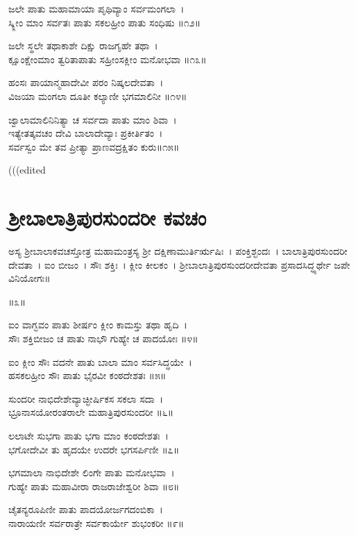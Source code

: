 ಜಲೇ ಪಾತು ಮಹಾಮಾಯಾ ಪೃಥಿವ್ಯಾಂ ಸರ್ವಮಂಗಲಾ~।\\
ಸ್ಕ್ಲೀಂ ಮಾಂ ಸರ್ವತಃ ಪಾತು ಸಕಲಹ್ರೀಂ ಪಾತು ಸಂಧಿಷು ॥೧೨॥

ಜಲೇ ಸ್ಥಲೇ ತಥಾಕಾಶೇ ದಿಕ್ಷು ರಾಜಗೃಹೇ ತಥಾ~।\\
ಕ್ಷೂಂಕ್ಷೇಂಮಾಂ ತ್ವರಿತಾಪಾತು ಸಹ್ರೀಂಸಕ್ಲೀಂ ಮನೋಭವಾ ॥೧೩॥

ಹಂಸಃ ಪಾಯಾನ್ಮಹಾದೇವೀ ಪರಂ ನಿಷ್ಕಲದೇವತಾ~।\\
ವಿಜಯಾ ಮಂಗಲಾ ದೂತೀ ಕಲ್ಯಾಣೀ ಭಗಮಾಲಿನೀ ॥೧೪॥

ಜ್ವಾಲಾಮಾಲಿನಿನಿತ್ಯಾ ಚ ಸರ್ವದಾ ಪಾತು ಮಾಂ ಶಿವಾ~।\\
ಇತ್ಯೇತತ್ಕವಚಂ ದೇವಿ ಬಾಲಾದೇವ್ಯಾಃ ಪ್ರಕೀರ್ತಿತಂ~।\\
ಸರ್ವಸ್ವಂ ಮೇ ತವ ಪ್ರೀತ್ಯಾ ಪ್ರಾಣವದ್ರಕ್ಷಿತಂ ಕುರು॥೧೫॥

(((edited
\section{ಶ್ರೀಬಾಲಾತ್ರಿಪುರಸುಂದರೀ ಕವಚಂ}

ಅಸ್ಯ ಶ್ರೀಬಾಲಾಕವಚಸ್ತೋತ್ರ ಮಹಾಮಂತ್ರಸ್ಯ ಶ್ರೀ ದಕ್ಷಿಣಾಮುರ್ತಿರ್ಋಷಿಃ~। ಪಂಕ್ತಿಶ್ಛಂದಃ~। ಬಾಲಾತ್ರಿಪುರಸುಂದರೀ ದೇವತಾ~। ಐಂ ಬೀಜಂ~। ಸೌಃ ಶಕ್ತಿಃ~। ಕ್ಲೀಂ ಕೀಲಕಂ~। ಶ್ರೀಬಾಲಾತ್ರಿಪುರಸುಂದರೀದೇವತಾ ಪ್ರಸಾದಸಿದ್ಧ್ಯರ್ಥೇ ಜಪೇ ವಿನಿಯೋಗಃ॥

॥೩॥

ಐಂ ವಾಗ್ಭವಂ ಪಾತು ಶೀರ್ಷಂ ಕ್ಲೀಂ ಕಾಮಸ್ತು ತಥಾ ಹೃದಿ~।\\
ಸೌಃ ಶಕ್ತಿಬೀಜಂ ಚ ಪಾತು ನಾಭೌ ಗುಹ್ಯೇ ಚ ಪಾದಯೋಃ ॥೪॥

ಐಂ ಕ್ಲೀಂ ಸೌಃ ವದನೇ ಪಾತು ಬಾಲಾ ಮಾಂ ಸರ್ವಸಿದ್ಧಯೇ~।\\
ಹಸಕಲಹ್ರೀಂ ಸೌಃ ಪಾತು  ಭೈರವೀ ಕಂಠದೇಶತಃ ॥೫॥

ಸುಂದರೀ ನಾಭಿದೇಶೇವ್ಯಾಚ್ಛೀರ್ಷಿಕಸ ಸಕಲಾ ಸದಾ~।\\
ಭ್ರೂನಾಸಯೋರಂತರಾಲೇ ಮಹಾತ್ರಿಪುರಸುಂದರೀ ॥೬॥

ಲಲಾಟೇ ಸುಭಗಾ ಪಾತು ಭಗಾ ಮಾಂ ಕಂಠದೇಶತಃ~।\\
ಭಗೋದೇವೀ ತು ಹೃದಯೇ ಉದರೇ ಭಗಸರ್ಪಿಣೀ ॥೭॥

ಭಗಮಾಲಾ ನಾಭಿದೇಶೇ ಲಿಂಗೇ ಪಾತು ಮನೋಭವಾ~।\\
ಗುಹ್ಯೇ ಪಾತು ಮಹಾವೀರಾ ರಾಜರಾಜೇಶ್ವರೀ ಶಿವಾ ॥೮॥

ಚೈತನ್ಯರೂಪಿಣೀ ಪಾತು ಪಾದಯೋರ್ಜಗದಂಬಿಕಾ~।\\
ನಾರಾಯಣೀ ಸರ್ವರಾತ್ರೇ ಸರ್ವಕಾರ್ಯೇ ಶುಭಂಕರೀ ॥೯॥

